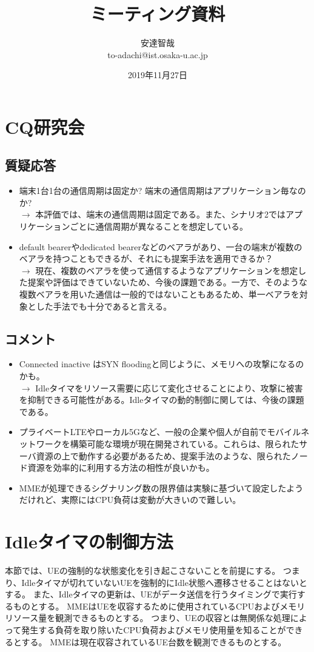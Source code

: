 \documentclass[a4j]{ujarticle}
\title{ミーティング資料}
\author{安達智哉\\to-adachi@ist.osaka-u.ac.jp}
\date{2019年11月27日}
\begin{document}
\maketitle

\section{CQ研究会}
\subsection{質疑応答}
  \begin{itemize}
    \item  端末1台1台の通信周期は固定か? 端末の通信周期はアプリケーション毎なのか?\\
    $\rightarrow$ 本評価では、端末の通信周期は固定である。また、シナリオ2ではアプリケーションごとに通信周期が異なることを想定している。
    \item default bearerやdedicated bearerなどのベアラがあり、一台の端末が複数のベアラを持つこともできるが、それにも提案手法を適用できるか？\\
    $\rightarrow$ 現在、複数のベアラを使って通信するようなアプリケーションを想定した提案や評価はできていないため、今後の課題である。一方で、そのような複数ベアラを用いた通信は一般的ではないこともあるため、単一ベアラを対象とした手法でも十分であると言える。
  \end{itemize}
\subsection{コメント}
  \begin{itemize}
    \item Connected inactive はSYN floodingと同じように、メモリへの攻撃になるのかも。\\
    $\rightarrow$ Idleタイマをリソース需要に応じて変化させることにより、攻撃に被害を抑制できる可能性がある。Idleタイマの動的制御に関しては、今後の課題である。
    \item プライベートLTEやローカル5Gなど、一般の企業や個人が自前でモバイルネットワークを構築可能な環境が現在開発されている。これらは、限られたサーバ資源の上で動作する必要があるため、提案手法のような、限られたノード資源を効率的に利用する方法の相性が良いかも。
    \item MMEが処理できるシグナリング数の限界値は実験に基づいて設定したようだけれど、実際にはCPU負荷は変動が大きいので難しい。
  \end{itemize}


\section{Idleタイマの制御方法}
\label{sec:hard-state}
本節では、UEの強制的な状態変化を引き起こさないことを前提にする。
つまり、Idleタイマが切れていないUEを強制的にIdle状態へ遷移させることはないとする。
また、Idleタイマの更新は、UEがデータ送信を行うタイミングで実行するものとする。
MMEはUEを収容するために使用されているCPUおよびメモリリソース量を観測できるものとする。
つまり、UEの収容とは無関係な処理によって発生する負荷を取り除いたCPU負荷およびメモリ使用量を知ることができるとする。
MMEは現在収容されているUE台数を観測できるものとする。
\end{document}
